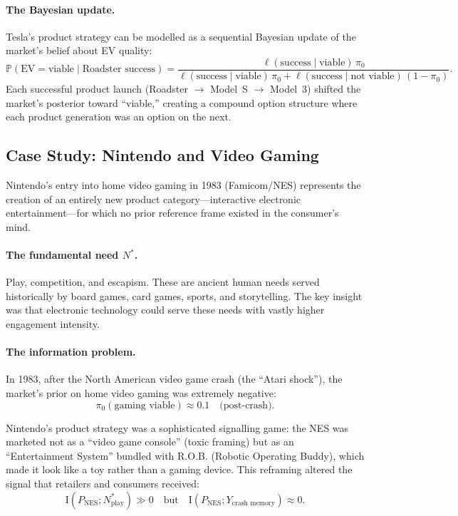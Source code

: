 \documentclass[12pt,a4paper,oneside]{book}
\theoremstyle{definition}
\theoremstyle{remark}
\newcommand{\Prob}{\mathbb{P}}
\newcommand{\MI}{\mathrm{I}}
\begin{document}
\paragraph{The Bayesian update.} Tesla's product strategy can be modelled as a sequential
Bayesian update of the market's belief about EV quality:
\begin{equation}\label{eq:tesla_bayes}
  \Prob(\text{EV} = \text{viable} \mid \text{Roadster success})
  = \frac{\ell(\text{success} \mid \text{viable})\,\pi_0}
    {\ell(\text{success} \mid \text{viable})\,\pi_0
    + \ell(\text{success} \mid \text{not viable})\,(1 - \pi_0)}.
\end{equation}
Each successful product launch (Roadster $\to$ Model~S $\to$ Model~3) shifted the
market's posterior toward ``viable,'' creating a compound option structure where each
product generation was an option on the next.

\subsection{Case Study: Nintendo and Video Gaming}

Nintendo's entry into home video gaming in 1983 (Famicom/NES) represents the creation
of an entirely new product category---interactive electronic entertainment---for which
no prior reference frame existed in the consumer's mind.

\paragraph{The fundamental need $N^*$.} Play, competition, and escapism. These are
ancient human needs served historically by board games, card games, sports, and
storytelling. The key insight was that electronic technology could serve these needs
with vastly higher engagement intensity.

\paragraph{The information problem.} In 1983, after the North American video game crash
(the ``Atari shock''), the market's prior on home video gaming was extremely negative:
\begin{equation}
  \pi_0(\text{gaming viable}) \approx 0.1 \quad \text{(post-crash)}.
\end{equation}

Nintendo's product strategy was a sophisticated signalling game: the NES was marketed
not as a ``video game console'' (toxic framing) but as an ``Entertainment System''
bundled with R.O.B. (Robotic Operating Buddy), which made it look like a toy rather
than a gaming device. This reframing altered the signal that retailers and consumers
received:
\begin{equation}
  \MI(P_{\text{NES}}; N^*_{\text{play}}) \gg 0
  \quad \text{but} \quad
  \MI(P_{\text{NES}}; Y_{\text{crash memory}}) \approx 0.
\end{equation}
\end{document}
